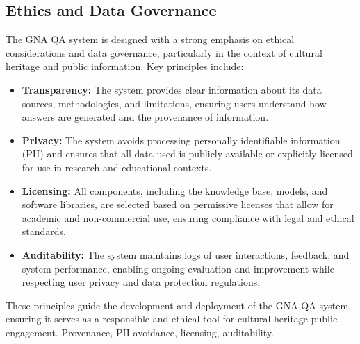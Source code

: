 \begin{spacing}{1.5}
\section{Ethics and Data Governance}
The GNA QA system is designed with a strong emphasis on ethical considerations and data governance, particularly in the context of cultural heritage and public information. Key principles include:
\begin{itemize}
\item \textbf{Transparency:} The system provides clear information about its data sources, methodologies, and limitations, ensuring users understand how answers are generated and the provenance of information.
\item \textbf{Privacy:} The system avoids processing personally identifiable information (PII) and ensures that all data used is publicly available or explicitly licensed for use in research and educational contexts.
\item \textbf{Licensing:} All components, including the knowledge base, models, and software libraries, are selected based on permissive licenses that allow for academic and non-commercial use, ensuring compliance with legal and ethical standards.
\item \textbf{Auditability:} The system maintains logs of user interactions, feedback, and system performance, enabling ongoing evaluation and improvement while respecting user privacy and data protection regulations.
\end{itemize}
These principles guide the development and deployment of the GNA QA system, ensuring it serves as a responsible and ethical tool for cultural heritage public engagement.
Provenance, PII avoidance, licensing, auditability.


\end{spacing}
